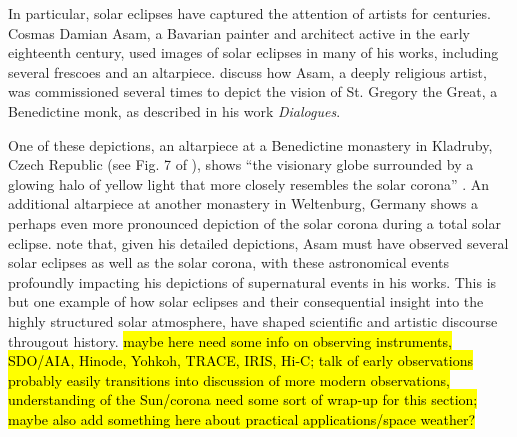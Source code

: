 %
\par In particular, solar eclipses have captured the attention of artists for centuries. Cosmas Damian Asam, a Bavarian painter and architect active in the early eighteenth century, used images of solar eclipses in many of his works, including several frescoes and an altarpiece. \citet{olson_st._2007} discuss how Asam, a deeply religious artist, was commissioned several times to depict the vision of St. Gregory the Great, a Benedictine monk, as described in his work \textit{Dialogues}. 
%
\par One of these depictions, an altarpiece at a Benedictine monastery in Kladruby, Czech Republic (see Fig. 7 of \citet{olson_st._2007}), shows ``the visionary globe surrounded by a glowing halo of yellow light that more closely resembles the solar corona'' \citep{olson_st._2007}. An additional altarpiece at another monastery in Weltenburg, Germany shows a perhaps even more pronounced depiction of the solar corona during a total solar eclipse. \citet{olson_st._2007} note that, given his detailed depictions, Asam must have observed several solar eclipses as well as the solar corona, with these astronomical events profoundly impacting his depictions of supernatural events in his works. This is but one example of how solar eclipses and their consequential insight into the highly structured solar atmosphere, have shaped scientific and artistic discourse througout history.
%
\hl{maybe here need some info on observing instruments, SDO/AIA, Hinode, Yohkoh, TRACE, IRIS, Hi-C; talk of early observations probably easily transitions into discussion of more modern observations, understanding of the Sun/corona need some sort of wrap-up for this section; maybe also add something here about practical applications/space weather?}
